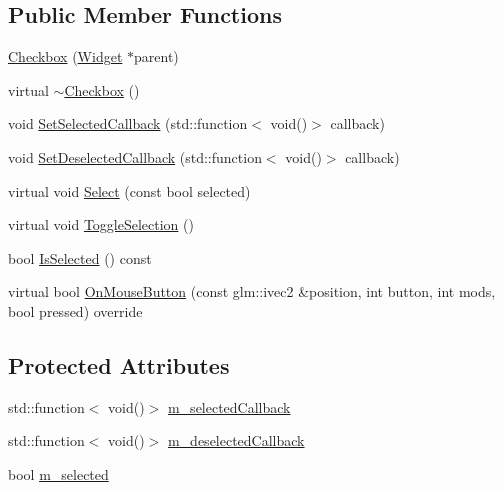 \subsection*{Public Member Functions}
\begin{DoxyCompactItemize}
\item 
\mbox{\hyperlink{classngl__gui_1_1_checkbox_adcc9cf43a4cff892c5e10bb41fe68777}{Checkbox}} (\mbox{\hyperlink{classngl__gui_1_1_widget}{Widget}} $\ast$parent)
\item 
virtual \mbox{\hyperlink{classngl__gui_1_1_checkbox_a31bdf168a6f602b81d8673db2317bdd4}{$\sim$\+Checkbox}} ()
\item 
void \mbox{\hyperlink{classngl__gui_1_1_checkbox_a09f0585a2fd2b73e15d1a755fa0d20c8}{Set\+Selected\+Callback}} (std\+::function$<$ void()$>$ callback)
\item 
void \mbox{\hyperlink{classngl__gui_1_1_checkbox_a1de9797b9fb31cb0e3f139f727224871}{Set\+Deselected\+Callback}} (std\+::function$<$ void()$>$ callback)
\item 
virtual void \mbox{\hyperlink{classngl__gui_1_1_checkbox_aa8045bf06c7121724c86083e5e5b166c}{Select}} (const bool selected)
\item 
virtual void \mbox{\hyperlink{classngl__gui_1_1_checkbox_a1cffeed17adcc790761916e4841a96d8}{Toggle\+Selection}} ()
\item 
bool \mbox{\hyperlink{classngl__gui_1_1_checkbox_a5352cab1a3b911eacb56422d41386390}{Is\+Selected}} () const
\item 
virtual bool \mbox{\hyperlink{classngl__gui_1_1_checkbox_a2616e2e230decef2a526e6fcfd59809e}{On\+Mouse\+Button}} (const glm\+::ivec2 \&position, int button, int mods, bool pressed) override
\end{DoxyCompactItemize}
\subsection*{Protected Attributes}
\begin{DoxyCompactItemize}
\item 
std\+::function$<$ void()$>$ \mbox{\hyperlink{classngl__gui_1_1_checkbox_a817578052ac5543eac703ba8e5f072c3}{m\+\_\+selected\+Callback}}
\item 
std\+::function$<$ void()$>$ \mbox{\hyperlink{classngl__gui_1_1_checkbox_aa2800070a32c1bd2137f1c16603e3883}{m\+\_\+deselected\+Callback}}
\item 
bool \mbox{\hyperlink{classngl__gui_1_1_checkbox_a218ceb62fd9ac89e1db17810f414984a}{m\+\_\+selected}}
\end{DoxyCompactItemize}
